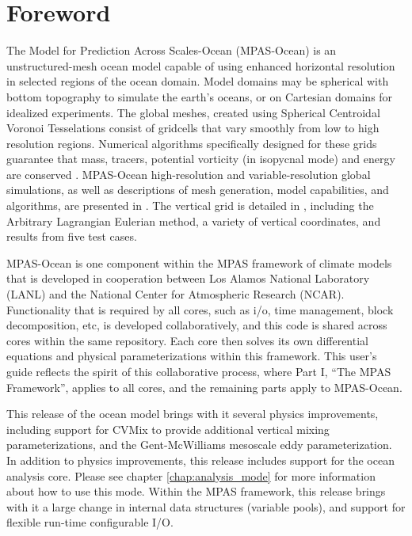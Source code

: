 \chapter*{Foreword}
\label{chap:foreword}
The Model for Prediction Across Scales-Ocean (MPAS-Ocean) is an unstructured-mesh ocean model capable of using enhanced horizontal resolution in selected regions of the ocean domain.  Model domains may be spherical with bottom topography to simulate the earth's oceans, or on Cartesian domains for idealized experiments.  The global meshes, created using Spherical Centroidal Voronoi Tesselations \citep{Ringler_ea08od,Ringler_ea11mwr} consist of gridcells that vary smoothly from low to high resolution regions. Numerical algorithms specifically designed for these grids guarantee that mass, tracers, potential vorticity (in isopycnal mode) and energy are conserved \citep{Thurburn_ea09jcp,Ringler_ea10jcp}.  MPAS-Ocean high-resolution and variable-resolution global simulations, as well as descriptions of mesh generation, model capabilities, and algorithms, are presented in \citet{Ringler_ea13om}.  The vertical grid is detailed in \citet{Petersen_ea14om}, including the Arbitrary Lagrangian Eulerian method, a variety of vertical coordinates, and results from five test cases.

MPAS-Ocean is one component within the MPAS framework of climate models that is developed in cooperation between Los Alamos National Laboratory (LANL) and the National Center for Atmospheric Research (NCAR).  Functionality that is required by all cores, such as i/o, time management, block decomposition, etc, is developed collaboratively, and this code is shared across cores within the same repository.  Each core then solves its own differential equations and physical parameterizations within this framework.  This user's guide reflects the spirit of this collaborative process, where Part I, ``The MPAS Framework'', applies to all cores, and the remaining parts apply to MPAS-Ocean.

This release of the ocean model brings with it several physics improvements, including support for CVMix to provide additional vertical mixing parameterizations, and the Gent-McWilliams mesoscale eddy parameterization. In addition to physics improvements, this release includes support for the ocean analysis core. Please see chapter \ref{chap:analysis_mode} for more information about how to use this mode. Within the MPAS framework, this release brings with it a large change in internal data structures (variable pools), and support for flexible run-time configurable I/O. 


